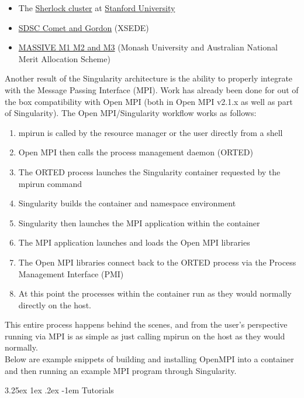\documentclass[a4paper]{article}
\makeatletter
\newcounter{subsubsubsection}[subsubsection]
\renewcommand\paragraph{\@startsection{paragraph}{5}{\z@}%
  {3.25ex \@plus1ex \@minus.2ex}%
  {-1em}%
  {\normalfont\normalsize\bfseries}}
\makeatother
\begin{document}
\begin{itemize}
\item The \href{http://sherlock.stanford.edu/}{Sherlock cluster} at \href{https://srcc.stanford.edu/}{Stanford University}
\item \href{https://www.xsede.org/news/-/news/item/7624}{SDSC Comet and Gordon} (XSEDE)
\item \href{http://docs.massive.org.au/index.html}{MASSIVE M1 M2 and M3} (Monash University and Australian National Merit Allocation Scheme)

\end{itemize}

Another result of the Singularity architecture is the ability to properly integrate with the Message Passing Interface (MPI). Work has already been done for out of the box compatibility with Open MPI (both in Open MPI v2.1.x as well as part of Singularity). The Open MPI/Singularity workflow works as follows:

\begin{enumerate}
\item mpirun is called by the resource manager or the user directly from a shell
\item Open MPI then calls the process management daemon (ORTED)
\item The ORTED process launches the Singularity container requested by the mpirun command
\item Singularity builds the container and namespace environment
\item Singularity then launches the MPI application within the container
\item The MPI application launches and loads the Open MPI libraries
\item The Open MPI libraries connect back to the ORTED process via the Process Management Interface (PMI)
\item At this point the processes within the container run as they would normally directly on the host.
\end{enumerate}

This entire process happens behind the scenes, and from the user’s perspective running via MPI is as simple as just calling mpirun on the host as they would normally.\\[0.1in]
Below are example snippets of building and installing OpenMPI into a container and then running an example MPI program through Singularity.


\paragraph{Tutorials}
\end{document}
